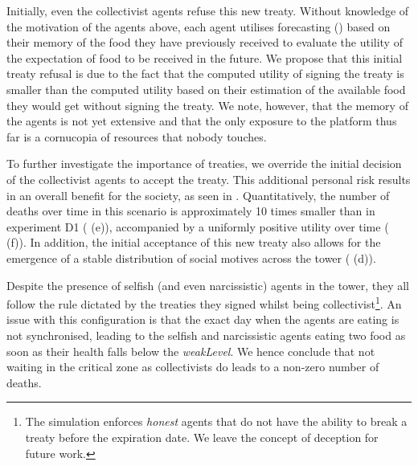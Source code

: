 Initially, even the collectivist agents refuse this new treaty. Without knowledge of the motivation of the agents above, each agent utilises forecasting () based on their memory of the food they have previously received to evaluate the utility of the expectation of food to be received in the future. We propose that this initial treaty refusal is due to the fact that the computed utility of signing the treaty is smaller than the computed utility based on their estimation of the available food they would get without signing the treaty. We note, however, that the memory of the agents is not yet extensive and that the only exposure to the platform thus far is a cornucopia of resources that nobody touches. 


To further investigate the importance of treaties, we override the initial decision of the collectivist agents to accept the treaty. This additional personal risk results in an overall benefit for the society, as seen in . Quantitatively, the number of deaths over time in this scenario is approximately 10 times smaller than in experiment D1 ( (e)), accompanied by a uniformly positive utility over time ( (f)). In addition, the initial acceptance of this new treaty also allows for the emergence of a stable distribution of social motives across the tower ( (d)).

Despite the presence of selfish (and even narcissistic) agents in the tower, they all follow the rule dictated by the treaties they signed whilst being collectivist\footnote{The simulation enforces \textit{honest} agents that do not have the ability to break a treaty before the expiration date. We leave the concept of deception for future work.}. An issue with this configuration is that the exact day when the agents are eating is not synchronised, leading to the selfish and narcissistic agents eating two food as soon as their health falls below the \textit{weakLevel}. We hence conclude that not waiting in the critical zone as collectivists do leads to a non-zero number of deaths.

